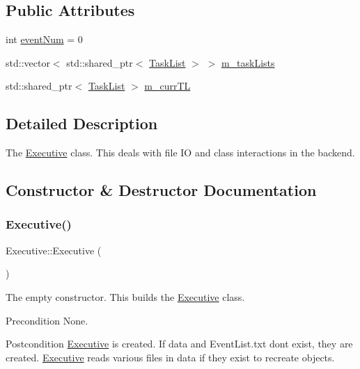 \subsection*{Public Attributes}
\begin{DoxyCompactItemize}
\item 
int \mbox{\hyperlink{class_executive_ab285c21199444e024f7b0df423f51827}{event\+Num}} = 0
\item 
std\+::vector$<$ std\+::shared\+\_\+ptr$<$ \mbox{\hyperlink{class_task_list}{Task\+List}} $>$ $>$ \mbox{\hyperlink{class_executive_abaad195f97ce0a4b4be35064f905fc30}{m\+\_\+task\+Lists}}
\item 
std\+::shared\+\_\+ptr$<$ \mbox{\hyperlink{class_task_list}{Task\+List}} $>$ \mbox{\hyperlink{class_executive_a80e57f901c3182811a700674066edb4d}{m\+\_\+curr\+TL}}
\end{DoxyCompactItemize}


\subsection{Detailed Description}
The \mbox{\hyperlink{class_executive}{Executive}} class. This deals with file IO and class interactions in the backend. 

\subsection{Constructor \& Destructor Documentation}
\mbox{\label{class_executive_ad870c1d741f1f313eb0c5a8336f8af6b}} 
\subsubsection{\texorpdfstring{Executive()}{Executive()}}
{\footnotesize\ttfamily Executive\+::\+Executive (\begin{DoxyParamCaption}{ }\end{DoxyParamCaption})}

The empty constructor. This builds the \mbox{\hyperlink{class_executive}{Executive}} class. \begin{DoxyPrecond}{Precondition}
None. 
\end{DoxyPrecond}
\begin{DoxyPostcond}{Postcondition}
\mbox{\hyperlink{class_executive}{Executive}} is created. If data and Event\+List.\+txt don\textquotesingle{}t exist, they are created. \mbox{\hyperlink{class_executive}{Executive}} reads various files in data if they exist to recreate objects. 
\end{DoxyPostcond}
\mbox{\label{class_executive_a4ce80c499f7640b1770ade77cf56d965}} 
